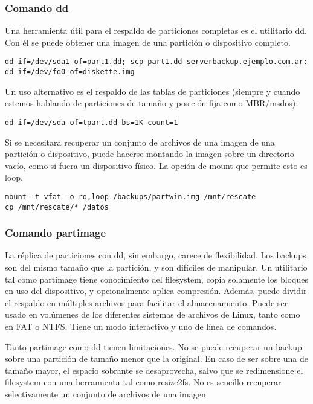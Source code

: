 \subsubsection{Comando dd}
Una herramienta útil para el respaldo de particiones completas es el utilitario dd. Con él se puede obtener una imagen de una partición o dispositivo completo. 

\begin{lstlisting}
dd if=/dev/sda1 of=part1.dd; scp part1.dd serverbackup.ejemplo.com.ar:
dd if=/dev/fd0 of=diskette.img
\end{lstlisting}

Un uso alternativo es el respaldo de las tablas de particiones (siempre y cuando estemos hablando de particiones de tamaño y posición fija como MBR/msdos):

\begin{lstlisting}
dd if=/dev/sda of=tpart.dd bs=1K count=1
\end{lstlisting}

Si se necesitara recuperar un conjunto de archivos de una imagen de una partición o dispositivo, puede hacerse montando la imagen sobre un directorio vacío, como si fuera un dispositivo físico. La opción de mount que permite esto es loop.

\begin{lstlisting}
mount -t vfat -o ro,loop /backups/partwin.img /mnt/rescate
cp /mnt/rescate/* /datos
\end{lstlisting}


\subsubsection{Comando partimage}

La réplica de particiones con dd, sin embargo, carece de flexibilidad. Los backups son del mismo tamaño que la partición, y son difíciles de manipular. Un utilitario tal como partimage tiene conocimiento del filesystem, copia solamente los bloques en uso del dispositivo, y opcionalmente aplica compresión. Además, puede dividir el respaldo en múltiples archivos para facilitar el almacenamiento. Puede ser usado en volúmenes de los diferentes sistemas de archivos de Linux, tanto como en FAT o NTFS. Tiene un modo interactivo y uno de línea de comandos.

Tanto partimage como dd tienen limitaciones. No se puede recuperar un backup sobre una partición de tamaño menor que la original. En caso de ser sobre una de tamaño mayor, el espacio sobrante se desaprovecha, salvo que se redimensione el filesystem con una herramienta tal como resize2fs. No es sencillo recuperar selectivamente un conjunto de archivos de una imagen.


